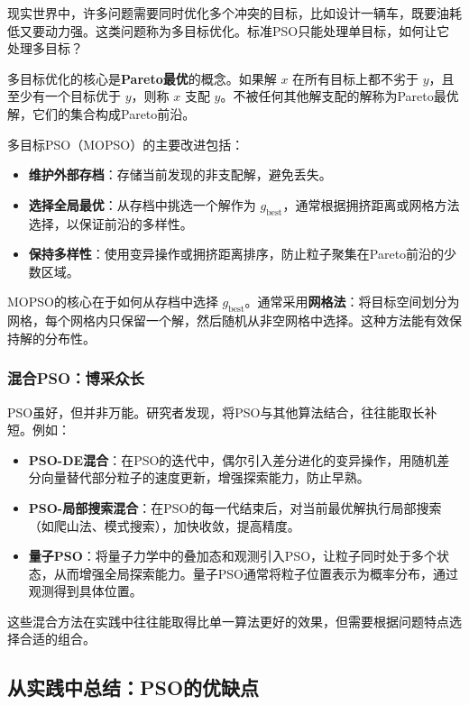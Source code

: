 \documentclass[lang=cn,zihao=-4,a4paper,fontset=windows]{beautybook}
\begin{document}
现实世界中，许多问题需要同时优化多个冲突的目标，比如设计一辆车，既要油耗低又要动力强。这类问题称为多目标优化。标准PSO只能处理单目标，如何让它处理多目标？

多目标优化的核心是\textbf{Pareto最优}的概念。如果解 $x$ 在所有目标上都不劣于 $y$，且至少有一个目标优于 $y$，则称 $x$ 支配 $y$。不被任何其他解支配的解称为Pareto最优解，它们的集合构成Pareto前沿。

多目标PSO（MOPSO）的主要改进包括：
\begin{itemize}
    \item \textbf{维护外部存档}：存储当前发现的非支配解，避免丢失。
    \item \textbf{选择全局最优}：从存档中挑选一个解作为 $g_{\text{best}}$，通常根据拥挤距离或网格方法选择，以保证前沿的多样性。
    \item \textbf{保持多样性}：使用变异操作或拥挤距离排序，防止粒子聚集在Pareto前沿的少数区域。
\end{itemize}

MOPSO的核心在于如何从存档中选择 $g_{\text{best}}$。通常采用\textbf{网格法}：将目标空间划分为网格，每个网格内只保留一个解，然后随机从非空网格中选择。这种方法能有效保持解的分布性。

\subsubsection{混合PSO：博采众长}

PSO虽好，但并非万能。研究者发现，将PSO与其他算法结合，往往能取长补短。例如：

\begin{itemize}
    \item \textbf{PSO-DE混合}：在PSO的迭代中，偶尔引入差分进化的变异操作，用随机差分向量替代部分粒子的速度更新，增强探索能力，防止早熟。
    \item \textbf{PSO-局部搜索混合}：在PSO的每一代结束后，对当前最优解执行局部搜索（如爬山法、模式搜索），加快收敛，提高精度。
    \item \textbf{量子PSO}：将量子力学中的叠加态和观测引入PSO，让粒子同时处于多个状态，从而增强全局探索能力。量子PSO通常将粒子位置表示为概率分布，通过观测得到具体位置。
\end{itemize}

这些混合方法在实践中往往能取得比单一算法更好的效果，但需要根据问题特点选择合适的组合。

\subsection{从实践中总结：PSO的优缺点}
\end{document}
